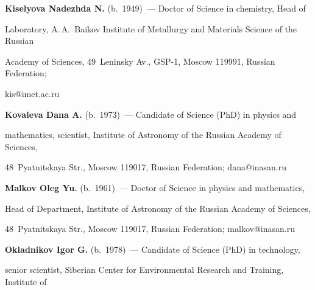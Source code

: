 \vspace*{3pt}





\noindent


       \textbf{Kiselyova Nadezhda N.} (b.\ 1949)~--- Doctor of Science in chemistry, Head of 


Laboratory, A.\,A.~Baikov Institute of Metallurgy and Materials Science of the Russian 


Academy of Sciences,  49~Leninsky Av., GSP-1, Moscow 119991, Russian Federation; 


kis@imet.ac.ru


       


\vspace*{3pt}





\noindent


       \textbf{Kovaleva Dana A.} (b.\ 1973)~--- Candidate of Science (PhD) in physics and 


mathematics, scientist, Institute of Astronomy of the Russian Academy of Sciences, 


48~Pyatnitskaya Str., Moscow 119017, Russian Federation; dana@inasan.ru


       


\vspace*{3pt}





\noindent


       \textbf{Malkov Oleg Yu.} (b.\ 1961)~--- Doctor of Science in physics and mathematics, 


Head of Department, Institute of Astronomy of the Russian Academy of Sciences, 


48~Pyatnitskaya Str., Moscow 119017, Russian Federation; malkov@inasan.ru


       


\vspace*{3pt}





\noindent


       \textbf{Okladnikov Igor G.} (b.\ 1978)~--- Candidate of Science (PhD) in technology, 


senior scientist, Siberian Center for Environmental Research and Training, Institute of 


